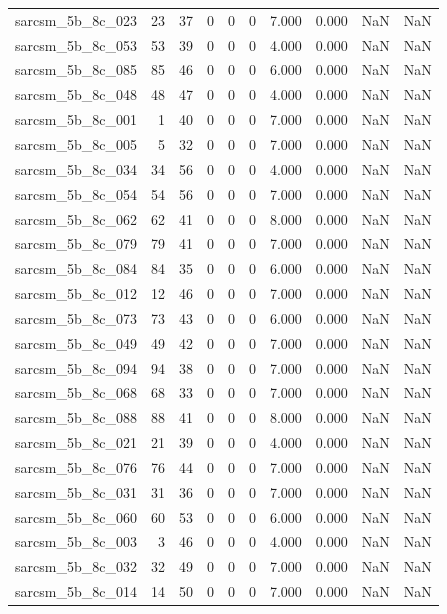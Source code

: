 \documentclass{article}
\begin{document}
\begin{longtable}{lrrrrrrrrr}
sarcsm\_5b\_8c\_023 & 23 & 37 & 0 & 0 & 0 & 7.000 & 0.000 & NaN & NaN \\
sarcsm\_5b\_8c\_053 & 53 & 39 & 0 & 0 & 0 & 4.000 & 0.000 & NaN & NaN \\
sarcsm\_5b\_8c\_085 & 85 & 46 & 0 & 0 & 0 & 6.000 & 0.000 & NaN & NaN \\
sarcsm\_5b\_8c\_048 & 48 & 47 & 0 & 0 & 0 & 4.000 & 0.000 & NaN & NaN \\
sarcsm\_5b\_8c\_001 & 1 & 40 & 0 & 0 & 0 & 7.000 & 0.000 & NaN & NaN \\
sarcsm\_5b\_8c\_005 & 5 & 32 & 0 & 0 & 0 & 7.000 & 0.000 & NaN & NaN \\
sarcsm\_5b\_8c\_034 & 34 & 56 & 0 & 0 & 0 & 4.000 & 0.000 & NaN & NaN \\
sarcsm\_5b\_8c\_054 & 54 & 56 & 0 & 0 & 0 & 7.000 & 0.000 & NaN & NaN \\
sarcsm\_5b\_8c\_062 & 62 & 41 & 0 & 0 & 0 & 8.000 & 0.000 & NaN & NaN \\
sarcsm\_5b\_8c\_079 & 79 & 41 & 0 & 0 & 0 & 7.000 & 0.000 & NaN & NaN \\
sarcsm\_5b\_8c\_084 & 84 & 35 & 0 & 0 & 0 & 6.000 & 0.000 & NaN & NaN \\
sarcsm\_5b\_8c\_012 & 12 & 46 & 0 & 0 & 0 & 7.000 & 0.000 & NaN & NaN \\
sarcsm\_5b\_8c\_073 & 73 & 43 & 0 & 0 & 0 & 6.000 & 0.000 & NaN & NaN \\
sarcsm\_5b\_8c\_049 & 49 & 42 & 0 & 0 & 0 & 7.000 & 0.000 & NaN & NaN \\
sarcsm\_5b\_8c\_094 & 94 & 38 & 0 & 0 & 0 & 7.000 & 0.000 & NaN & NaN \\
sarcsm\_5b\_8c\_068 & 68 & 33 & 0 & 0 & 0 & 7.000 & 0.000 & NaN & NaN \\
sarcsm\_5b\_8c\_088 & 88 & 41 & 0 & 0 & 0 & 8.000 & 0.000 & NaN & NaN \\
sarcsm\_5b\_8c\_021 & 21 & 39 & 0 & 0 & 0 & 4.000 & 0.000 & NaN & NaN \\
sarcsm\_5b\_8c\_076 & 76 & 44 & 0 & 0 & 0 & 7.000 & 0.000 & NaN & NaN \\
sarcsm\_5b\_8c\_031 & 31 & 36 & 0 & 0 & 0 & 7.000 & 0.000 & NaN & NaN \\
sarcsm\_5b\_8c\_060 & 60 & 53 & 0 & 0 & 0 & 6.000 & 0.000 & NaN & NaN \\
sarcsm\_5b\_8c\_003 & 3 & 46 & 0 & 0 & 0 & 4.000 & 0.000 & NaN & NaN \\
sarcsm\_5b\_8c\_032 & 32 & 49 & 0 & 0 & 0 & 7.000 & 0.000 & NaN & NaN \\
sarcsm\_5b\_8c\_014 & 14 & 50 & 0 & 0 & 0 & 7.000 & 0.000 & NaN & NaN \\

\end{longtable}
\end{document}
